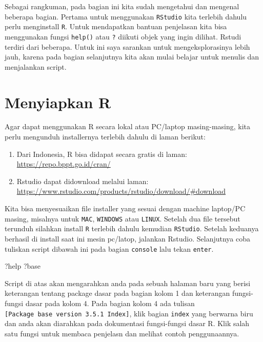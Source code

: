 \documentclass[]{book}
\newenvironment{Shaded}{\begin{snugshade}}{\end{snugshade}}
\newcommand{\NormalTok}[1]{#1}
\providecommand{\tightlist}{%
  \setlength{\itemsep}{0pt}\setlength{\parskip}{0pt}}
\begin{document}
Sebagai rangkuman, pada bagian ini kita sudah mengetahui dan mengenal
beberapa bagian. Pertama untuk menggunakan \texttt{RStudio} kita
terlebih dahulu perlu menginstall \texttt{R}. Untuk mendapatkan bantuan
penjelasan kita bisa menggunakan fungsi \texttt{help()} atau \texttt{?}
diikuti objek yang ingin dilihat. Rstudi terdiri dari beberapa. Untuk
ini saya sarankan untuk mengeksplorasinya lebih jauh, karena pada bagian
selanjutnya kita akan mulai belajar untuk menulis dan menjalankan
script.

\hypertarget{menyiapkan-r}{%
\section{Menyiapkan R}\label{menyiapkan-r}}

Agar dapat menggunakan R secara lokal atau PC/laptop masing-masing, kita
perlu mengunduh installernya terlebih dahulu di laman berikut:

\begin{enumerate}
\def\labelenumi{\arabic{enumi}.}
\tightlist
\item
  Dari Indonesia, R bisa didapat secara gratis di laman:
  \url{https://repo.bppt.go.id/cran/}
\item
  Rstudio dapat didownload melalui laman:
  \url{https://www.rstudio.com/products/rstudio/download/\#download}
\end{enumerate}

Kita bisa menyesuaikan file installer yang sesuai dengan machine
laptop/PC masing, misalnya untuk \texttt{MAC}, \texttt{WINDOWS} atau
\texttt{LINUX}. Setelah dua file tersebut terunduh silahkan install
\texttt{R} terlebih dahulu kemudian \texttt{RStudio}. Setelah keduanya
berhasil di install saat ini mesin pc/latop, jalankan Rstudio.
Selanjutnya coba tuliskan script dibawah ini pada bagian
\texttt{console} lalu tekan \texttt{enter}.

\begin{Shaded}
\begin{Highlighting}[]
\NormalTok{?help}
\NormalTok{?base}
\end{Highlighting}
\end{Shaded}

Script di atas akan mengarahkan anda pada sebuah halaman baru yang
berisi keterangan tentang package dasar \citep{R-base} pada bagian kolom
1 dan keterangan fungsi-fungsi dasar pada kolom 4. Pada bagian kolom 4
ada tulisan \texttt{{[}Package\ base\ version\ 3.5.1\ Index{]}}, klik
bagian \texttt{index} yang berwarna biru dan anda akan diarahkan pada
dokumentasi fungsi-fungsi dasar R. Klik salah satu fungsi untuk membaca
penjelasn dan melihat contoh penggunaannya.
\end{document}
